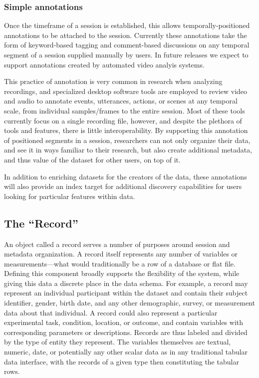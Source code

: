 \documentclass{sig-alternate}
\begin{document}
\subsubsection*{Simple annotations}

Once the timeframe of a session is established, this allows temporally-positioned annotations to be attached to the session.
Currently these annotations take the form of keyword-based tagging and comment-based discussions on any temporal segment of a session supplied manually by users.
In future releases we expect to support annotations created by automated video analyis systems.

This practice of annotation is very common in research when analyzing recordings, and specialized desktop software tools are employed to review video and audio to annotate events, utterances, actions, or scenes at any temporal scale, from individual samples/frames to the entire session.
Most of these tools currently focus on a single recording file, however, and despite the plethora of tools and features, there is little interoperability.
By supporting this annotation of positioned segments in a session, researchers can not only organize their data, and see it in ways familiar to their research, but also create additional metadata, and thus value of the dataset for other users, on top of it.

In addition to enriching datasets for the creators of the data, these annotations will also provide an index target for additional discovery capabilities for users looking for particular features within data.

\subsection{The ``Record''}

An object called a record serves a number of purposes around session and metadata organization.
A record itself represents any number of variables or measurements---what would traditionally be a row of a database or flat file.
Defining this component broadly supports the flexibility of the system, while giving this data a discrete place in the data schema.
For example, a record may represent an individual participant within the dataset and contain their subject identifier, gender, birth date, and any other demographic, survey, or measurement data about that individual.
A record could also represent a particular experimental task, condition, location, or outcome, and contain variables with corresponding parameters or descriptions.
Records are thus labeled and divided by the type of entity they represent.
The variables themselves are textual, numeric, date, or potentially any other scalar data as in any traditional tabular data interface, with the records of a given type then constituting the tabular rows.
\end{document}

